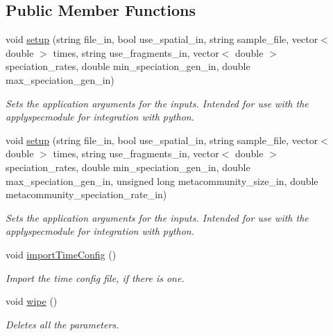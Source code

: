 \subsection*{Public Member Functions}
\begin{DoxyCompactItemize}
\item 
void \hyperlink{struct_spec_sim_parameters_a8dfb82b7d5e4927a81383f55c2bd8175}{setup} (string file\+\_\+in, bool use\+\_\+spatial\+\_\+in, string sample\+\_\+file, vector$<$ double $>$ times, string use\+\_\+fragments\+\_\+in, vector$<$ double $>$ speciation\+\_\+rates, double min\+\_\+speciation\+\_\+gen\+\_\+in, double max\+\_\+speciation\+\_\+gen\+\_\+in)
\begin{DoxyCompactList}\small\item\em Sets the application arguments for the inputs. Intended for use with the applyspecmodule for integration with python. \end{DoxyCompactList}\item 
void \hyperlink{struct_spec_sim_parameters_af203c1f89e195c31da558659ba890ce1}{setup} (string file\+\_\+in, bool use\+\_\+spatial\+\_\+in, string sample\+\_\+file, vector$<$ double $>$ times, string use\+\_\+fragments\+\_\+in, vector$<$ double $>$ speciation\+\_\+rates, double min\+\_\+speciation\+\_\+gen\+\_\+in, double max\+\_\+speciation\+\_\+gen\+\_\+in, unsigned long metacommunity\+\_\+size\+\_\+in, double metacommunity\+\_\+speciation\+\_\+rate\+\_\+in)
\begin{DoxyCompactList}\small\item\em Sets the application arguments for the inputs. Intended for use with the applyspecmodule for integration with python. \end{DoxyCompactList}\item 
void \hyperlink{struct_spec_sim_parameters_ae0196a50a551a821b75b6e92a35534a7}{import\+Time\+Config} ()\hypertarget{struct_spec_sim_parameters_ae0196a50a551a821b75b6e92a35534a7}{}\label{struct_spec_sim_parameters_ae0196a50a551a821b75b6e92a35534a7}

\begin{DoxyCompactList}\small\item\em Import the time config file, if there is one. \end{DoxyCompactList}\item 
void \hyperlink{struct_spec_sim_parameters_a10aac8e7ab592f53b071287e60483b88}{wipe} ()\hypertarget{struct_spec_sim_parameters_a10aac8e7ab592f53b071287e60483b88}{}\label{struct_spec_sim_parameters_a10aac8e7ab592f53b071287e60483b88}

\begin{DoxyCompactList}\small\item\em Deletes all the parameters. \end{DoxyCompactList}\end{DoxyCompactItemize}
